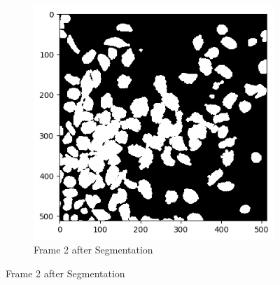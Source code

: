 \documentclass{article}
\begin{document}
\begin{figure}[h!]
\begin{subfigure}{0.4\textwidth}
    \includegraphics[width=\linewidth]{Report/Appendix_Images/Segmentation-A-Control/frame_2.png}
    \caption*{Frame 2 after Segmentation}
  \end{subfigure}


\end{figure}
\end{document}
